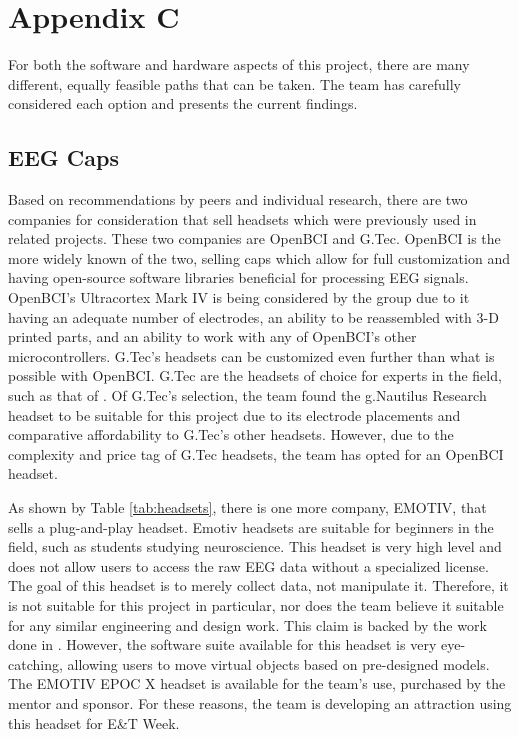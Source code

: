 \documentclass[conference]{IEEEtran}
\begin{document}
\clearpage
\setcounter{section}{3}
\renewcommand{\thesubsection}{C.\Alph{subsection}}
\section*{\textbf{Appendix C}}
        \setcounter{figure}{0}
        \renewcommand{\thefigure}{C.\arabic{figure}}
        \setcounter{table}{0}
        \renewcommand{\thetable}{C.\arabic{table}}
    \setcounter{subsection}{0}
    For both the software and hardware aspects of this project, there are many different, equally feasible paths that can be taken. The team has carefully considered each option and presents the current findings.
    
        \subsection{EEG Caps}
        Based on recommendations by peers and individual research, there are two companies for consideration that sell headsets which were previously used in related projects. These two companies are OpenBCI and G.Tec. OpenBCI is the more widely known of the two, selling caps which allow for full customization and having open-source software libraries beneficial for processing EEG signals. {OpenBCI's Ultracortex Mark IV is being considered by the group due to it having an adequate number of electrodes, an ability to be reassembled with 3-D printed parts, and an ability to work with any of OpenBCI's other microcontrollers.} G.Tec's headsets can be customized even further than what is possible with OpenBCI. G.Tec are the headsets of choice for experts in the field, such as that of \cite{learning_to_control}.  {Of G.Tec's selection, the team found the g.Nautilus Research headset to be suitable for this project due to its electrode placements and comparative affordability to G.Tec's other headsets.} However, due to the complexity and price tag of G.Tec headsets, the team has opted for an OpenBCI headset.
        
        As shown by Table \ref{tab:headsets}, there is one more company, EMOTIV, that sells a plug-and-play headset. Emotiv headsets are suitable for beginners in the field, such as students studying neuroscience. This headset is very high level and does not allow users to access the raw EEG data without a specialized license. The goal of this headset is to merely collect data, not manipulate it. Therefore, it is not suitable for this project in particular, nor does the team believe it suitable for any similar engineering and design work. This claim is backed by the work done in \cite{self_paced, biomedical-signal}. However, the software suite available for this headset is very eye-catching, allowing users to move virtual objects based on pre-designed models. The  {EMOTIV EPOC X} headset is available for the team's use, purchased by the mentor and sponsor. For these reasons, the team is developing an attraction using this headset for E\&T Week. 
        
\end{document}

